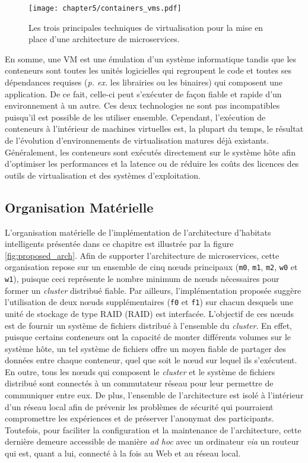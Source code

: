 \begin{figure}[H]
	\centering
	\texttt{[image: chapter5/containers\_vms.pdf]}
		\caption{Les trois principales techniques de virtualisation pour la mise en place d'une architecture de microservices.}
	\label{fig:containers_vms}
\end{figure}

En somme, une \acs{VM} est une émulation d'un système informatique tandis que les conteneurs sont toutes les unités logicielles qui regroupent le code et toutes ses dépendances requises (\textit{p. ex.} les librairies ou les binaires) qui composent une application. De ce fait, celle-ci peut s'exécuter de façon fiable et rapide d'un environnement à un autre. Ces deux technologies ne sont pas incompatibles puisqu'il est possible de les utiliser ensemble. Cependant, l'exécution de conteneurs à l'intérieur de machines virtuelles est, la plupart du temps, le résultat de l'évolution d'environnements de virtualisation matures déjà existants. Généralement, les conteneurs sont exécutés directement sur le système hôte afin d'optimiser les performances et la latence ou de réduire les coûts des licences des outils de virtualisation et des systèmes d'exploitation.

\subsection{Organisation Matérielle}

L'organisation matérielle de l'implémentation de l'architecture d'habitats intelligents présentée dans ce chapitre est illustrée par la figure \ref{fig:proposed_arch}. Afin de supporter l'architecture de microservices, cette organisation repose sur un ensemble de cinq n\oe{}uds principaux (\texttt{m0}, \texttt{m1}, \texttt{m2}, \texttt{w0} et \texttt{w1}), puisque ceci représente le nombre minimum de n\oe{}uds nécessaires pour former un \textit{cluster} distribué fiable. Par ailleurs, l'implémentation proposée suggère l'utilisation de deux  n\oe{}uds supplémentaires (\texttt{f0} et \texttt{f1}) sur chacun desquels une unité de stockage de type \acs{RAID} (\acl{RAID}) est interfacée. L'objectif de ces n\oe{}uds est de fournir un système de fichiers distribué à l'ensemble du \textit{cluster}. En effet, puisque certains conteneurs ont la capacité de monter différents volumes sur le système hôte, un tel système de fichiers offre un moyen fiable de partager des données entre chaque conteneur, quel que soit le n\oe{}ud sur lequel ils s'exécutent. En outre, tous les n\oe{}uds qui composent le \textit{cluster} et le système de fichiers distribué sont connectés à un commutateur réseau pour leur permettre de communiquer entre eux. De plus, l'ensemble de l'architecture est isolé à l'intérieur d'un réseau local afin de prévenir les problèmes de sécurité qui pourraient compromettre les expériences et de préserver l'anonymat des participants. Toutefois, pour faciliter la configuration et la maintenance de l'architecture, cette dernière demeure accessible de manière \textit{ad hoc} avec un ordinateur \textit{via} un routeur qui est, quant a lui, connecté à la fois au Web et au réseau local.

